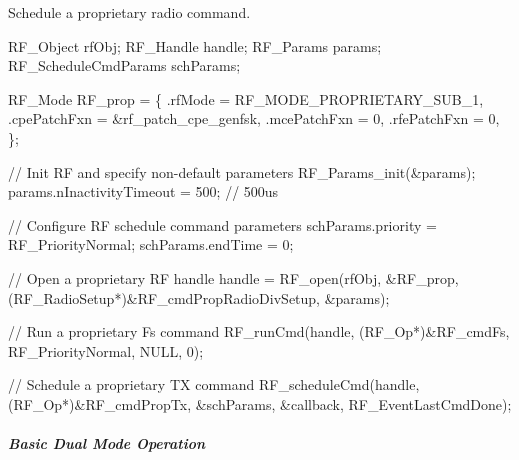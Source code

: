 Schedule a proprietary radio command. 
\begin{DoxyCode}
RF_Object rfObj;
RF_Handle handle;
RF_Params params;
RF_ScheduleCmdParams schParams;

RF_Mode RF\_prop =
\{
    .rfMode      = RF\_MODE\_PROPRIETARY\_SUB\_1,
    .cpePatchFxn = &rf\_patch\_cpe\_genfsk,
    .mcePatchFxn = 0,
    .rfePatchFxn = 0,
\};

\textcolor{comment}{// Init RF and specify non-default parameters}
RF_Params_init(&params);
params.nInactivityTimeout = 500; \textcolor{comment}{// 500us}

\textcolor{comment}{// Configure RF schedule command parameters}
schParams.priority = RF_PriorityNormal;
schParams.endTime  = 0;

\textcolor{comment}{// Open a proprietary RF handle}
handle = RF_open(rfObj, &RF\_prop, (RF_RadioSetup*)&RF\_cmdPropRadioDivSetup, &params);

\textcolor{comment}{// Run a proprietary Fs command}
RF_runCmd(handle, (RF_Op*)&RF\_cmdFs, RF_PriorityNormal, NULL, 0);

\textcolor{comment}{// Schedule a proprietary TX command}
RF_scheduleCmd(handle, (RF_Op*)&RF\_cmdPropTx, &schParams, &callback, 
      RF_EventLastCmdDone);
\end{DoxyCode}


\subparagraph*{Basic Dual Mode Operation}

